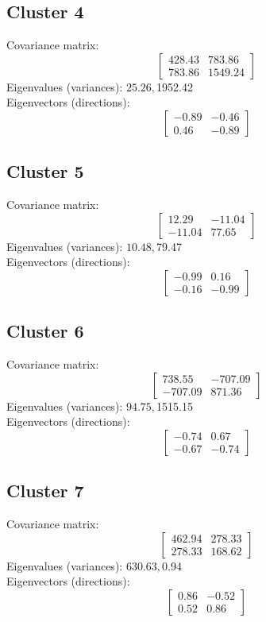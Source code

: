 \documentclass{article}
\begin{document}
\subsection*{Cluster 4}
Covariance matrix:
\[\begin{bmatrix}428.43 & 783.86 \\783.86 & 1549.24\end{bmatrix}\]
Eigenvalues (variances): $ 25.26, $1952.42\\
Eigenvectors (directions):
\[\begin{bmatrix}-0.89 & -0.46 \\0.46 & -0.89\end{bmatrix}\]
\subsection*{Cluster 5}
Covariance matrix:
\[\begin{bmatrix}12.29 & -11.04 \\-11.04 & 77.65\end{bmatrix}\]
Eigenvalues (variances): $ 10.48, $79.47\\
Eigenvectors (directions):
\[\begin{bmatrix}-0.99 & 0.16 \\-0.16 & -0.99\end{bmatrix}\]
\subsection*{Cluster 6}
Covariance matrix:
\[\begin{bmatrix}738.55 & -707.09 \\-707.09 & 871.36\end{bmatrix}\]
Eigenvalues (variances): $ 94.75, $1515.15\\
Eigenvectors (directions):
\[\begin{bmatrix}-0.74 & 0.67 \\-0.67 & -0.74\end{bmatrix}\]
\subsection*{Cluster 7}
Covariance matrix:
\[\begin{bmatrix}462.94 & 278.33 \\278.33 & 168.62\end{bmatrix}\]
Eigenvalues (variances): $ 630.63, $0.94\\
Eigenvectors (directions):
\[\begin{bmatrix}0.86 & -0.52 \\0.52 & 0.86\end{bmatrix}\]
\end{document}
